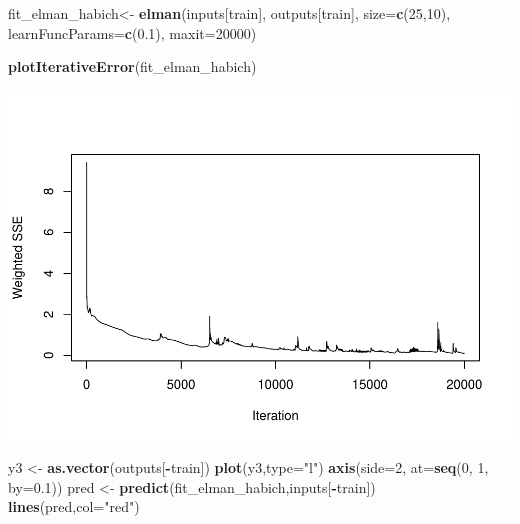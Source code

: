 \documentclass[
]{book}
\newenvironment{Shaded}{\begin{snugshade}}{\end{snugshade}}
\newcommand{\AttributeTok}[1]{\textcolor[rgb]{0.13,0.29,0.53}{#1}}
\newcommand{\DecValTok}[1]{\textcolor[rgb]{0.00,0.00,0.81}{#1}}
\newcommand{\FloatTok}[1]{\textcolor[rgb]{0.00,0.00,0.81}{#1}}
\newcommand{\FunctionTok}[1]{\textcolor[rgb]{0.13,0.29,0.53}{\textbf{#1}}}
\newcommand{\NormalTok}[1]{#1}
\newcommand{\OtherTok}[1]{\textcolor[rgb]{0.56,0.35,0.01}{#1}}
\newcommand{\SpecialCharTok}[1]{\textcolor[rgb]{0.81,0.36,0.00}{\textbf{#1}}}
\newcommand{\StringTok}[1]{\textcolor[rgb]{0.31,0.60,0.02}{#1}}
\begin{document}
\begin{Shaded}
\begin{Highlighting}[]
\NormalTok{fit\_elman\_habich}\OtherTok{\textless{}{-}} \FunctionTok{elman}\NormalTok{(inputs[train],}
\NormalTok{                       outputs[train],}
                       \AttributeTok{size=}\FunctionTok{c}\NormalTok{(}\DecValTok{25}\NormalTok{,}\DecValTok{10}\NormalTok{),}
                       \AttributeTok{learnFuncParams=}\FunctionTok{c}\NormalTok{(}\FloatTok{0.1}\NormalTok{),}
                       \AttributeTok{maxit=}\DecValTok{20000}\NormalTok{)}


\FunctionTok{plotIterativeError}\NormalTok{(fit\_elman\_habich)}
\end{Highlighting}
\end{Shaded}

\includegraphics{bookdown-demo_files/figure-latex/unnamed-chunk-192-1.pdf}

\begin{Shaded}
\begin{Highlighting}[]
\NormalTok{y3 }\OtherTok{\textless{}{-}} \FunctionTok{as.vector}\NormalTok{(outputs[}\SpecialCharTok{{-}}\NormalTok{train])}
\FunctionTok{plot}\NormalTok{(y3,}\AttributeTok{type=}\StringTok{"l"}\NormalTok{)}
\FunctionTok{axis}\NormalTok{(}\AttributeTok{side=}\DecValTok{2}\NormalTok{, }\AttributeTok{at=}\FunctionTok{seq}\NormalTok{(}\DecValTok{0}\NormalTok{, }\DecValTok{1}\NormalTok{, }\AttributeTok{by=}\FloatTok{0.1}\NormalTok{))}
\NormalTok{pred }\OtherTok{\textless{}{-}} \FunctionTok{predict}\NormalTok{(fit\_elman\_habich,inputs[}\SpecialCharTok{{-}}\NormalTok{train])}
\FunctionTok{lines}\NormalTok{(pred,}\AttributeTok{col=}\StringTok{"red"}\NormalTok{)}
\end{Highlighting}
\end{Shaded}
\end{document}

